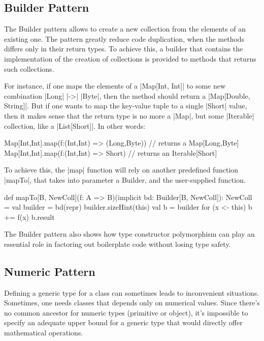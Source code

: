 \subsection{Builder Pattern}

The Builder pattern allows to create a new collection from the elements of an existing one. The pattern greatly reduce code duplication, when the methods differs only in their return types. To achieve this, a builder that contains the implementation of the creation of collections is provided to methods that returns such collections.


For instance, if one maps the elements of a |Map[Int, Int]| to some new combination |Long| |->| |Byte|, then the method should return a |Map[Double, String]|. But if one wants to map the key-value tuple to a single |Short| value, then it makes sense that the return type is no more a |Map|, but some |Iterable| collection, like a |List[Short]|. In other words:

\begin{lstlisting-nobreak}
 Map[Int,Int].map(f:(Int,Int) => (Long,Byte))
      // returns a Map[Long,Byte]
 Map[Int,Int].map(f:(Int,Int) => Short)
      // returns an Iterable[Short]
\end{lstlisting-nobreak}

To achieve this, the |map| function will rely on another predefined function |mapTo|, that takes into parameter a Builder, and the user-supplied function.

\begin{lstlisting-nobreak}
 def mapTo[B, NewColl](f: A => B)(implicit bd: Builder[B, NewColl]): NewColl = {
   val builder = bd(repr)
   builder.sizeHint(this)
   val b = builder
   for (x <- this) b += f(x)
   b.result
 }
\end{lstlisting-nobreak}



The Builder pattern also shows how type constructor polymorphism can play an essential role in factoring out boilerplate code without losing type safety.\cite{adriaan}

\subsection{Numeric Pattern}

Defining a generic type for a class can sometimes leads to inconvenient situations. Sometimes, one needs classes that depends only on numerical values. Since there's no common ancestor for numeric types (primitive or object), it's impossible to specify an adequate upper bound for a generic type that would directly offer mathematical operations.


